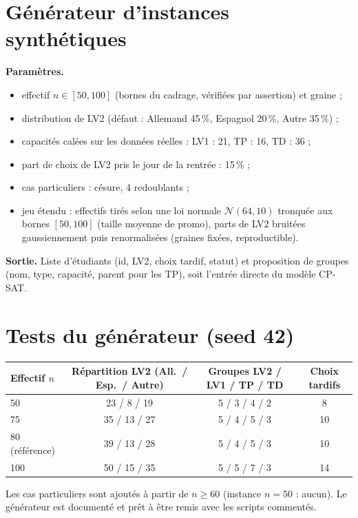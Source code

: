 \documentclass[11pt,a4paper]{article}
\begin{document}
\section{Générateur d'instances synthétiques}
\textbf{Paramètres.}
\begin{itemize}[leftmargin=2em,itemsep=1pt,topsep=2pt,label={\textbullet}]
  \item effectif $n \in [50,100]$ (bornes du cadrage, vérifiées par assertion) et graine ;
  \item distribution de LV2 (défaut : Allemand 45\,\%, Espagnol 20\,\%, Autre 35\,\%) ;
  \item capacités calées sur les données réelles : LV1 : 21, TP : 16, TD : 36 ;
  \item part de choix de LV2 pris le jour de la rentrée : 15\,\% ;
  \item cas particuliers : césure, 4 redoublants ;
  \item jeu étendu : effectifs tirés selon une loi normale $\mathcal{N}(64, 10)$ tronquée aux bornes $[50,100]$ (taille moyenne de promo), parts de LV2 bruitées gaussiennement puis renormalisées (graines fixées, reproductible).
\end{itemize}

\textbf{Sortie.} Liste d'étudiants (id, LV2, choix tardif, statut) et proposition de groupes (nom, type, capacité, parent pour les TP), soit l'entrée directe du modèle CP-SAT.

\section{Tests du générateur (seed 42)}
\begin{center}
{\small\setlength{\tabcolsep}{4pt}
\begin{tabular}{lccc}
\toprule
Effectif $n$ & Répartition LV2 (All.\ / Esp.\ / Autre) & Groupes LV2 / LV1 / TP / TD & Choix tardifs \\
\midrule
50 & 23 / 8 / 19 & 5 / 3 / 4 / 2 & 8 \\
75 & 35 / 13 / 27 & 5 / 4 / 5 / 3 & 10 \\
80 (référence) & 39 / 13 / 28 & 5 / 4 / 5 / 3 & 10 \\
100 & 50 / 15 / 35 & 5 / 5 / 7 / 3 & 14 \\
\bottomrule
\end{tabular}}
\end{center}

Les cas particuliers sont ajoutés à partir de $n \ge 60$ (instance $n = 50$ : aucun). Le générateur est documenté et prêt à être remis avec les scripts commentés.
\end{document}
